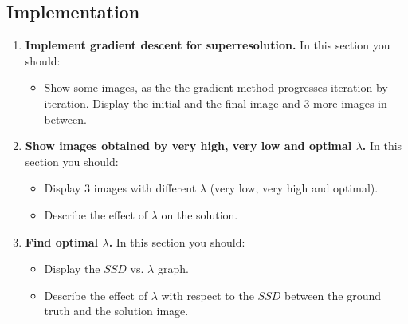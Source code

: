 \documentclass{paper}
\begin{document}
\subsection*{Implementation}

\begin{enumerate}

\item \textbf{Implement gradient descent for superresolution.} In this section you should:

\begin{itemize}
\item Show some images, as the the gradient method progresses iteration by iteration. Display the initial and the final image and 3 more images in between.
\end{itemize}

\item \textbf{Show images obtained by very high, very low and optimal $\lambda$.} In this section you should:

\begin{itemize}
\item Display 3 images with different $\lambda$ (very low, very high and optimal).
\item Describe the effect of $\lambda$ on the solution.
\end{itemize}

\item \textbf{ Find optimal $\lambda$.} In this section you should:

\begin{itemize}
\item Display the $SSD$ vs. $\lambda$ graph.
\item Describe the effect of $\lambda$ with respect to the $SSD$ between the ground truth and the solution image.
\end{itemize}


\end{enumerate}


 
\end{document}
